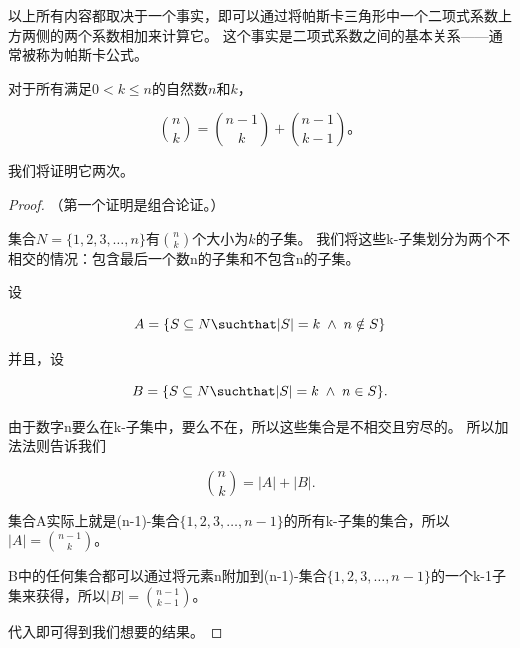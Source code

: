 以上所有内容都取决于一个事实，即可以通过将帕斯卡三角形中一个二项式系数上方两侧的两个系数相加来计算它。
这个事实是二项式系数之间的基本关系——通常被称为帕斯卡公式。

\begin{thm}
对于所有满足$0 < k \leq n$的自然数$n$和$k$，

\[ \binom{n}{k} = \binom{n-1}{k} + \binom{n-1}{k-1}。\]
\end{thm}

我们将证明它两次。

\begin{proof} 
（第一个证明是组合论证。）

集合$N = \{1, 2, 3, \ldots, n\}$有$\binom{n}{k}$个大小为$k$的子集。
我们将这些k-子集划分为两个不相交的情况：包含最后一个数n的子集和不包含n的子集。

设

\[ A = \{ S \subseteq N \suchthat |S| = k \; \land \; n \notin S \} \]

\noindent 并且，设

\[ B = \{ S \subseteq N \suchthat |S| = k \; \land \; n \in S \}. \]

由于数字n要么在k-子集中，要么不在，所以这些集合是不相交且穷尽的。
所以加法法则告诉我们

\[ \binom{n}{k} = |A| + |B|. \]

集合A实际上就是(n-1)-集合$\{1, 2, 3, \ldots, n-1 \}$的所有k-子集的集合，所以$|A| = \binom{n-1}{k}$。

B中的任何集合都可以通过将元素n附加到(n-1)-集合$\{1, 2, 3, \ldots, n-1 \}$的一个k-1子集来获得，所以$|B| = \binom{n-1}{k-1}$。

代入即可得到我们想要的结果。
\end{proof}

